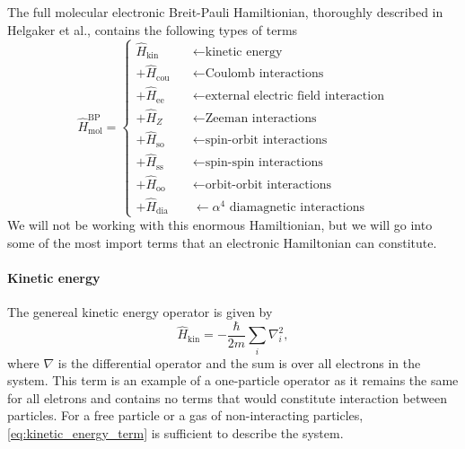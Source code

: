     The full  molecular electronic Breit-Pauli Hamiltionian, thoroughly described in 
    Helgaker et al.\cite{helgaker2012recent}, contains the following types of terms
    \begin{equation}
        \label{eq:breit_pauli_hamiltonian}
        \hat{H}^{\text{BP}}_{\text{mol}}
        = \begin{cases}
            \hat{H}_{\text{kin}} \quad &\leftarrow \text{kinetic energy} \\
            + \hat{H}_{\text{cou}} \quad &\leftarrow \text{Coulomb interactions} \\
            + \hat{H}_{\text{ee}} \quad &\leftarrow \text{external electric field interaction} \\
            + \hat{H}_Z \quad &\leftarrow \text{Zeeman interactions} \\
            + \hat{H}_{\text{so}} &\leftarrow \text{spin-orbit interactions} \\
            + \hat{H}_{\text{ss}} &\leftarrow \text{spin-spin interactions} \\
            + \hat{H}_{\text{oo}} &\leftarrow \text{orbit-orbit interactions} \\
            + \hat{H}_{\text{dia}} &\leftarrow \alpha^4 \text{ diamagnetic interactions}
        \end{cases}
    \end{equation}
    We will not be working with this enormous Hamiltionian, but we will go into some of the
    most import terms that an electronic Hamiltonian can constitute. 
    
    \paragraph{Kinetic energy}

    The genereal kinetic energy operator is given by
    \begin{equation}
        \label{eq:kinetic_energy_term}
        \hat{H}_{\text{kin}}
            = - \frac{\hbar}{2m}\sum_i \nabla^2_i,
    \end{equation}
    where $\nabla$ is the differential operator and the sum is over all electrons in 
    the system. This term is an example of a one-particle operator as it remains the 
    same for all eletrons and contains no terms that would constitute interaction 
    between particles. For a free particle or a gas of non-interacting particles, 
    \autoref{eq:kinetic_energy_term} is sufficient to describe the system. 

